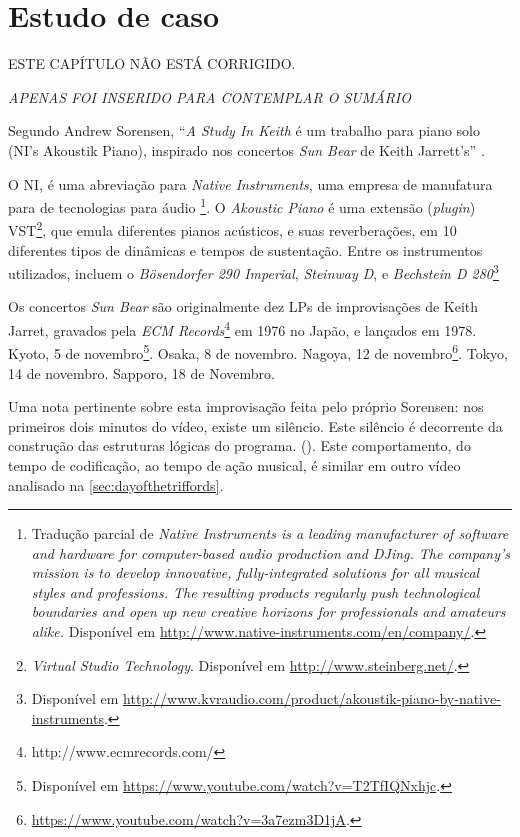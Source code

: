 \chapter{Estudo de caso}\label{cap:estudos_de_caso}
\begin{frame}
\centering
\Large{ESTE CAPÍTULO NÃO ESTÁ CORRIGIDO.} 

\emph{APENAS FOI INSERIDO PARA CONTEMPLAR O SUMÁRIO}
\end{frame}


Segundo Andrew Sorensen, ``\emph{A Study In Keith} é um trabalho para piano solo (NI's Akoustik Piano), inspirado nos concertos \emph{Sun Bear} de Keith Jarrett's'' \cite{sorensen_keith_2009}.

O NI, é uma abreviação para \emph{Native Instruments}, uma empresa de manufatura para  de tecnologias para áudio \footnote{Tradução parcial  de \emph{Native Instruments is a leading manufacturer of software and hardware for computer-based audio production and DJing. The company's mission is to develop innovative, fully-integrated solutions for all musical styles and professions. The resulting products regularly push technological boundaries and open up new creative horizons for professionals and amateurs alike.} Disponível em \url{http://www.native-instruments.com/en/company/}.}. O \emph{Akoustic Piano} é uma extensão (\emph{plugin}) VST\footnote{\emph{Virtual Studio Technology}. Disponível em \url{http://www.steinberg.net/}.}, que emula diferentes pianos acústicos, e suas reverberações, em 10 diferentes tipos de dinâmicas e tempos de sustentação. Entre os instrumentos utilizados, incluem o \emph{Bösendorfer 290 Imperial}, \emph{Steinway D}, e \emph{Bechstein D 280}\footnote{Disponível em \url{http://www.kvraudio.com/product/akoustik-piano-by-native-instruments}.}

Os concertos \emph{Sun Bear} são originalmente dez LPs  de improvisações de Keith Jarret, gravados pela \emph{ECM Records}\footnote{http://www.ecmrecords.com/} em 1976 no Japão, e lançados em 1978. Kyoto, 5 de novembro\footnote{Disponível em \url{https://www.youtube.com/watch?v=T2TfIQNxhjc}.}. Osaka, 8 de novembro. Nagoya, 12 de novembro\footnote{\url{https://www.youtube.com/watch?v=3a7ezm3D1jA}.}. Tokyo, 14 de novembro. Sapporo, 18 de Novembro.

Uma nota pertinente sobre esta improvisação feita pelo próprio Sorensen: nos primeiros dois minutos do vídeo, existe um silêncio. Este silêncio é decorrente da construção das estruturas lógicas do programa. (). Este comportamento, do tempo de codificação, ao tempo de ação musical, é similar em outro vídeo analisado na  \autoref{sec:dayofthetriffords}. 

